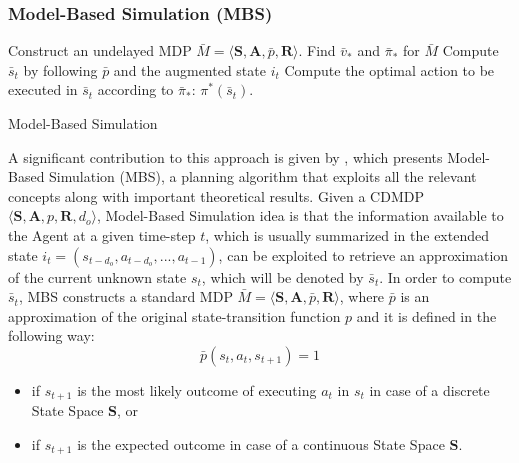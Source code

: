                 
            \subsubsection{Model-Based Simulation (MBS)}
                \begin{algorithm}[t]
                    \SetAlgoLined
                    Construct an undelayed MDP $\bar{M} = \langle \mathbf{S}, \mathbf{A}, \bar{p}, \mathbf{R}\rangle$.\;
                    Find  $\bar{v}_{*}$ and $\bar{\pi}_{*}$ for $\bar{M}$\;
                    Compute $\bar{s}_t$ by following $\bar{p}$ and the augmented state $i_t$\;
                    Compute the optimal action to be executed in $\bar{s}_t$ according to $\bar{\pi}_{*}$: $\pi^{*}(\bar{s}_t)$.
                    \caption{Model-Based Simulation}
                    \label{algo:mbs}
                \end{algorithm}
                A significant contribution to this approach is given by , which presents Model-Based Simulation (MBS), a planning algorithm that exploits all the relevant concepts along with important theoretical results. \newline
                Given a CDMDP $\langle \mathbf{S}, \mathbf{A}, p, \mathbf{R}, d_o\rangle$, Model-Based Simulation idea is that the information available to the Agent at a given time-step $t$, which is usually summarized in the extended state $i_t = \left( s_{t-d_{o}}, a_{t-d_{o}},..., a_{t-1}\right)$, can be exploited to retrieve an approximation of the current unknown state $s_t$, which will be denoted by $\bar{s}_t$. In order to compute $\bar{s}_t$, MBS constructs a standard MDP $\bar{M} = \langle \mathbf{S}, \mathbf{A}, \bar{p}, \mathbf{R}\rangle$, where $\bar{p}$ is an approximation of the original state-transition function $p$ and it is defined in the following way:
                \[  \bar{p}(s_t, a_t, s_{t+1}) = 1 \] 
                
                \begin{itemize}
                    \item if $s_{t+1}$ is the most likely outcome of executing $a_t$ in $s_t$ in case of a discrete State Space $\mathbf{S}$, or
                    \item if $s_{t+1}$ is the expected outcome in case of a continuous State Space $\mathbf{S}$.
                \end{itemize}
                
